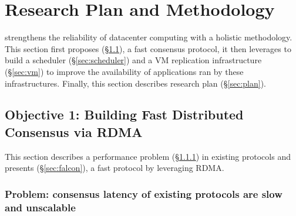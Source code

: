 \vspace{-.15in}\section{Research Plan and Methodology}
\label{sec:rep}\vspace{-.075in}

\xxx strengthens the reliability of datacenter 
computing with a holistic methodology. This section first proposes \falcon 
(\S\ref{sec:protocol}), a fast consensus protocol, it then leverages \falcon to 
build a scheduler (\S\ref{sec:scheduler}) and a VM replication infrastructure 
(\S\ref{sec:vm}) to improve the availability of applications ran by these 
infrastructures. Finally, this section describes research plan 
(\S\ref{sec:plan}).

\vspace{-.15in}\subsection{Objective 1: Building Fast Distributed Consensus via
RDMA}\label{sec:protocol}\vspace{-.075in}

This section describes a performance problem (\S\ref{sec:latency-problem}) in 
existing \paxos protocols and presents \falcon (\S\ref{sec:falcon}), a 
fast \paxos protocol by leveraging RDMA.

\vspace{-.15in}
\subsubsection{Problem: consensus latency of existing \paxos 
protocols are slow and unscalable} 
\label{sec:latency-problem}\vspace{-.075in}



